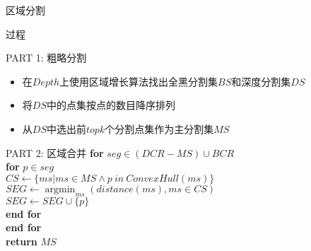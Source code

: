 \documentclass[xcolor=table,notheorems,compress,blue]{beamer}
\begin{document}
	\begin{frame}{区域分割}
		\vspace{-10pt}
		\begin{exampleblock}{过程}
		\end{exampleblock}
		\vspace{-18pt}
		\begin{exampleblock}{\small{PART 1: 粗略分割}}
			\begin{itemize}
				\item 在$Depth$上使用区域增长算法找出全黑分割集$BS$和深度分割集$DS$ 
				\item 将$DS$中的点集按点的数目降序排列
				\item 从$DS$中选出前$topk$个分割点集作为主分割集$MS$
			\end{itemize}
		\end{exampleblock}
		\vspace{-15pt}
		\begin{exampleblock}{\small{PART 2: 区域合并}}
			\textbf{for} {$seg \in  (DCR - MS) \cup BCR$}
			\\ \quad \textbf{for} {$p \in seg$}
			\\ \quad \quad $CS \leftarrow \{ms|ms \in MS \wedge p\ in\ ConvexHull(ms)\}$
			\\ \quad \quad $SEG \leftarrow \mathop{\arg\min}_{ms}(distance(ms), ms\in CS)$	
			\\ \quad \quad $SEG \leftarrow SEG \cup \{p\}$
			\\ \quad \textbf{end for}
			\\ \textbf{end for} 
			\\ \textbf{return} $MS$
		\end{exampleblock}
	\end{frame}
	
\end{document}
